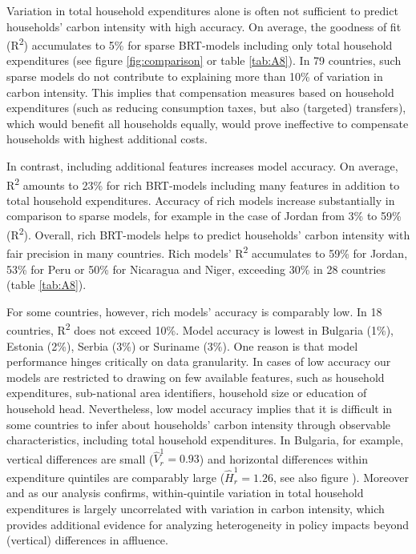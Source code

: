 \documentclass[12pt, a4paper]{article}
\begin{document}
Variation in total household expenditures alone is often not sufficient to predict households' carbon intensity with high accuracy. On average, the goodness of fit (R\textsuperscript{2}) accumulates to 5\% for sparse BRT-models including only total household expenditures (see figure \ref{fig:comparison} or table \ref{tab:A8}). In 79 countries, such sparse models do not contribute to explaining more than 10\% of variation in carbon intensity. This implies that compensation measures based on household expenditures (such as reducing consumption taxes, but also (targeted) transfers), which would benefit all households equally, would prove ineffective to compensate households with highest additional costs.

In contrast, including additional features increases model accuracy. On average, R\textsuperscript{2} amounts to 23\% for rich BRT-models including many features in addition to total household expenditures. Accuracy of rich models increase substantially in comparison to sparse models, for example in the case of Jordan from 3\% to 59\% (R\textsuperscript{2}). Overall, rich BRT-models helps to predict households' carbon intensity with fair precision in many countries. Rich models' R\textsuperscript{2} accumulates to 59\% for Jordan, 53\% for Peru or 50\% for Nicaragua and Niger, exceeding 30\% in 28 countries (table \ref{tab:A8}).

For some countries, however, rich models' accuracy is comparably low. In 18 countries, R\textsuperscript{2} does not exceed 10\%. Model accuracy is lowest in Bulgaria (1\%), Estonia (2\%), Serbia (3\%) or Suriname (3\%). One reason is that model performance hinges critically on data granularity. In cases of low accuracy our models are restricted to drawing on few available features, such as household expenditures, sub-national area identifiers, household size or education of household head. Nevertheless, low model accuracy implies that it is difficult in some countries to infer about households' carbon intensity through observable characteristics, including total household expenditures. In Bulgaria, for example, vertical differences are small ($\widehat{V}_{r}^{1}=0.93$) and horizontal differences within expenditure quintiles are comparably large ($\widehat{H}_{r}^{1}=1.26$, see also figure ). Moreover and as our analysis confirms, within-quintile variation in total household expenditures is largely uncorrelated with variation in carbon intensity, which provides additional evidence for analyzing heterogeneity in policy impacts beyond (vertical) differences in affluence.
\end{document}
